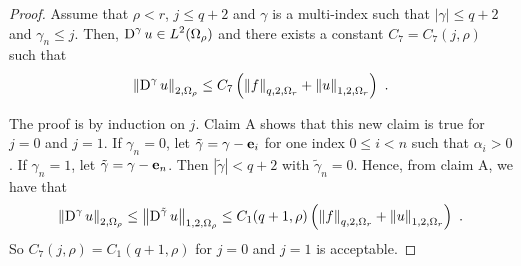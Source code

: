\begin{proof}
 Assume that $\rho<r$, $j\leq q+2$ and
$\gamma$ is a multi-index such that $|\gamma|\leq q+2$ and
$\gamma_n \leq j$.  Then,
$\displaystyle \operatorname{D}^\gamma u \in L^2(\Omega_\rho)$ and there
exists a constant $C_7=C_7(j,\rho)$ such that
\begin{equation} \label{ell_claim2a}
\left\|\operatorname{D}^\gamma u \right\|_{2,\Omega_\rho} \leq C_7 \left(
\left\|f\right\|_{q,2,\Omega_r} + \left\|u\right\|_{1,2,\Omega_r} \right) \ .
\end{equation}

The proof is by induction on $j$.  Claim A shows
that this new claim is true for $j=0$ and $j=1$.  If $\gamma_n=0$, let
$\tilde{\gamma} = \gamma - \mathbf{e}_i$ for one index $0\leq i <n$ such that
$\alpha_i>0$.  If $\gamma_n=1$, let $\tilde{\gamma} = \gamma - \mathbf{e}_n$.
Then $|\tilde{\gamma}|<q+2$ with $\tilde{\gamma}_n =0$.  Hence, from
claim A, we have that
\[
\left\|\operatorname{D}^\gamma u \right\|_{2,\Omega_\rho}
\leq \left\|\operatorname{D}^{\tilde{\gamma}} u \right\|_{1,2,\Omega_\rho}
\leq C_1(q+1,\rho) \left( \left\|f\right\|_{q,2,\Omega_r}
+ \left\|u\right\|_{1,2,\Omega_r} \right) \ .
\]
So $C_7(j,\rho) = C_1(q+1,\rho)$ for $j=0$ and $j=1$ is acceptable. 


\end{proof}
